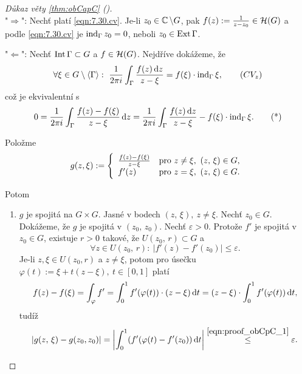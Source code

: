 \begin{proof}[Důkaz věty \cref{thm:obCapC} ()]
\mbox{}\\
    "$\Longrightarrow$": Nechť platí \cref{eqn:7.30.cv}. Je-li $z_0\in\operatorname{\mathbb{C}}\setminus G$, pak $f(z):=\frac{1}{z-z_0}\in\operatorname{\mathcal{H}} (G)$ a podle \cref{eqn:7.30.cv} je $\operatorname{ind}_\Gamma z_0=0$, neboli $z_0\in \operatorname{Ext}\Gamma$.
    
    "$\Longleftarrow$": Nechť $\operatorname{Int}\Gamma\subset G$ a $f\in \operatorname{\mathcal{H}} (G)$. Nejdříve dokážeme, že 
    \begin{equation}
        \forall\xi\in G\setminus\langle\Gamma\rangle:\ 
        \frac{1}{2\pi i}\int_\Gamma\frac{f(z) \diff z}{z-\xi}=f(\xi)\cdot\ind_\Gamma \xi,
        \label{eqn:10.8:cvz} 
        \tag{$CV_z$}
    \end{equation}
    což je ekvivalentní s 
    \begin{equation}
        0=\frac{1}{2\pi i}\int_\Gamma\frac{f(z) -f(\xi)}{z-\xi}\mathop{}\!\mathrm{d} z=\frac{1}{2\pi i}\int_\Gamma\frac{f(z) \mathop{}\!\mathrm{d} z}{z-\xi}-f(\xi)\cdot\operatorname{ind}_\Gamma \xi.
        \tag{*}
        \label{eqn:proof_obCapC_ekviv}
    \end{equation}
    
    Položme 
    $$g(z,\xi):=\twopartdef{\frac{f(z)-f(\xi)}{z-\xi}}{z\neq\xi,\ (z,\, \xi)\in G,}{f'(z)}{z=\xi,\ (z,\, \xi)\in G.}$$
    
    Potom 
    \begin{enumerate}[label=(\alph*)]
        \item $g$ je spojitá na $G\times G$. Jasné v bodech $(z,\, \xi),\ z\neq\xi.$ Nechť $z_0\in G$. Dokážeme, že $g$ je spojitá v $(z_0,\, z_0)$. Nechť $\varepsilon>0.$ Protože $f'$ je spojitá v $z_0\in G$, existuje $r>0$ takové, že $U(z_0,\, r)\subset G$ a 
        \begin{equation}
            \forall z \in U(z_0,\, r):\ 
            \left|f'(z)-f'(z_0)\right|\leq\varepsilon.
            \tag{$\times$}
            \label{eqn:proof_obCpC_1}
        \end{equation}
        Je-li $z,\xi\in U(z_0,r)$ a $z\neq\xi$, potom pro úsečku $\varphi(t):=\xi+t(z-\xi),\ t\in [0,1]$ platí 
        $$f(z)-f(\xi)=\int_\varphi f'=\int_0^1 f'(\varphi(t))\cdot(z-\xi)\mathop{}\!\mathrm{d} t=(z-\xi)\cdot\int_0^1 f'(\varphi(t))\mathop{}\!\mathrm{d} t,$$
        tudíž 
        $$|g(z,\, \xi)-g(z_0,z_0)|=\left|\int_0^1(f'(\varphi(t)-f'(z_0))\diff t \right|\stackrel{\cref{eqn:proof_obCpC_1}}{\leq}\varepsilon.$$
        

\end{enumerate}
\end{proof}
